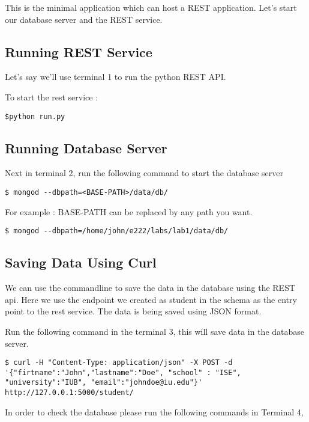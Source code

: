 \documentclass{article}
\begin{document}
This is the minimal application which can host a REST
application. Let's start our database server and the REST service.

\subsection{Running REST Service}

Let's say we'll use terminal 1 to run the python REST API.

To start the rest service :
\begin{verbatim}
$python run.py
\end{verbatim}

\subsection{Running Database Server}

Next in terminal 2, run the following command to start the database server
\begin{verbatim}
$ mongod --dbpath=<BASE-PATH>/data/db/
\end{verbatim}

For example :
BASE-PATH can be replaced by any path you want. 
\begin{verbatim}
$ mongod --dbpath=/home/john/e222/labs/lab1/data/db/
\end{verbatim}

\subsection{Saving Data Using Curl}

We can use the commandline to save the data in the database using the
REST api. Here we use the endpoint we created as student in the schema
as the entry point to the rest service. The data is being saved using
JSON format.

Run the following command in the terminal 3, this will save data in
the database server.

\begin{verbatim}
$ curl -H "Content-Type: application/json" -X POST -d 
'{"firtname":"John","lastname":"Doe", "school" : "ISE",
"university":"IUB", "email":"johndoe@iu.edu"}' http://127.0.0.1:5000/student/
\end{verbatim}

\newline

In order to check the database please run the following commands in Terminal 4,
\end{document}
